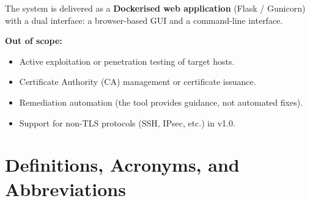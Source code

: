 The system is delivered as a \textbf{Dockerised web application} (Flask / Gunicorn)
with a dual interface: a browser-based GUI and a command-line interface.

\textbf{Out of scope:}
\begin{itemize}[noitemsep]
  \item Active exploitation or penetration testing of target hosts.
  \item Certificate Authority (CA) management or certificate issuance.
  \item Remediation automation (the tool provides guidance, not automated fixes).
  \item Support for non-TLS protocols (SSH, IPsec, etc.) in v1.0.
\end{itemize}

\section{Definitions, Acronyms, and Abbreviations}
\label{sec:definitions}


